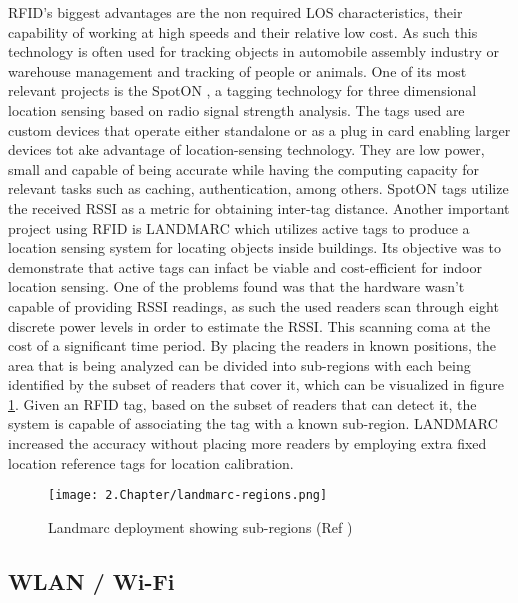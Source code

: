 \ac{RFID}'s biggest advantages are the non required \ac{LOS} characteristics, their capability of working at high speeds and their relative low cost. As such this technology is often used for tracking objects in automobile assembly industry or warehouse management and tracking of people or animals.
One of its most relevant projects is the SpotON \cite{spoton}, a tagging technology for three dimensional location sensing based on radio signal strength analysis. The tags used are custom devices that operate either standalone or as a plug in card enabling larger devices tot ake advantage of location-sensing technology. They are low power, small and capable of being accurate while having the computing capacity for relevant tasks such as caching, authentication, among others. SpotON tags utilize the received \ac{RSSI} as a metric for obtaining inter-tag distance.
Another important project using \ac{RFID} is LANDMARC\cite{landmarc} which utilizes active tags to produce a location sensing system for locating objects inside buildings. Its objective was to demonstrate that active tags can infact be viable and cost-efficient for indoor location sensing. One of the problems found was that the hardware wasn't capable of providing \ac{RSSI} readings, as such the used readers scan through eight discrete power levels in order to estimate the \ac{RSSI}. This scanning coma at the cost of a significant time period. By placing the readers in known positions, the area that is being analyzed can be divided into sub-regions with each being identified by the subset of readers that cover it, which can be visualized in figure \ref{fig:land}. Given an RFID tag, based on the subset of readers that can detect it, the system is capable of associating the tag with a known sub-region. LANDMARC increased the accuracy without placing more
readers by employing extra fixed location reference tags for location calibration.

\begin{figure}[H]
	\centering
		\texttt{[image: 2.Chapter/landmarc-regions.png]}
	\caption[Landmarc deployment showing sub-regions (Ref \cite{landmarc}) ]{Landmarc deployment showing sub-regions (Ref \cite{landmarc})}
	\label{fig:land}
\end{figure}


\subsection{WLAN / Wi-Fi}
\label{subsec:wifi}

